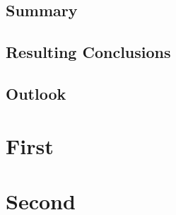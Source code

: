\documentclass{seal_thesis}
\begin{document}
\section{Summary}
\section{Resulting Conclusions}
\section{Outlook}

\appendix

\chapter{First}
\chapter{Second}

\backmatter

\nocite{*}



\end{document}
